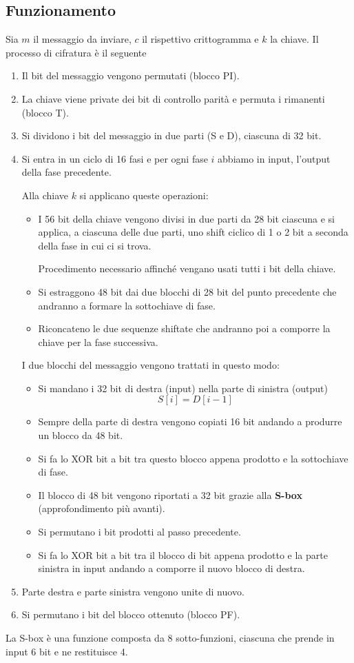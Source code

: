\subsection{Funzionamento}\label{funzionamento_DES}
Sia $m$ il messaggio da inviare, $c$ il rispettivo crittogramma e $k$ la chiave. Il processo di cifratura \`e il seguente
\begin{enumerate}
	\item Il bit del messaggio vengono permutati (blocco PI).
	\item La chiave viene private dei bit di controllo parit\`a e permuta i rimanenti (blocco T).
	\item Si dividono i bit del messaggio in due parti (S e D), ciascuna di 32 bit.
	\item Si entra in un ciclo di 16 fasi e per ogni fase $i$ abbiamo in input, l'output della fase precedente.

	      Alla chiave $k$ si applicano queste operazioni:
	      \begin{itemize}
		      \item I 56 bit della chiave vengono divisi in due parti da 28 bit ciascuna e si applica, a ciascuna delle
		            due parti, uno shift ciclico di 1 o 2 bit a seconda della fase in cui ci si trova.

		            Procedimento necessario affinch\'e vengano usati tutti i bit della chiave.
		      \item Si estraggono 48 bit dai due blocchi di 28 bit del punto precedente che andranno a formare la
		            sottochiave di fase.
		      \item Riconcateno le due sequenze shiftate che andranno poi a comporre la chiave per la fase successiva.
	      \end{itemize}
	      I due blocchi del messaggio vengono trattati in questo modo:
	      \begin{itemize}
		      \item Si mandano i 32 bit di destra (input) nella parte di sinistra (output)
		            \[ S[i] = D[i-1] \]
		      \item Sempre della parte di destra vengono copiati 16 bit andando a produrre un blocco da 48 bit.
		      \item Si fa lo XOR bit a bit tra questo blocco appena prodotto e la sottochiave di fase.
		      \item Il blocco di 48 bit vengono riportati a 32 bit grazie alla \textbf{S-box} (approfondimento pi\`u
		            avanti).
		      \item Si permutano i bit prodotti al passo precedente.
		      \item Si fa lo XOR bit a bit tra il blocco di bit appena prodotto e la parte sinistra in input andando a
		            comporre il nuovo blocco di destra.
	      \end{itemize}
	\item Parte destra e parte sinistra vengono unite di nuovo.
	\item Si permutano i bit del blocco ottenuto (blocco PF).
\end{enumerate}
La S-box \`e una funzione composta da 8 sotto-funzioni, ciascuna che prende in input 6 bit e ne restituisce 4.

